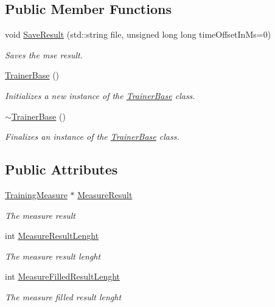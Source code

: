 \subsection*{Public Member Functions}
\begin{DoxyCompactItemize}
\item 
void \hyperlink{class_n_n_t_lib_1_1_trainer_base_ac048e1d40c13b919dc254559acf715e8}{Save\+Result} (std\+::string file, unsigned long long time\+Offset\+In\+Ms=0)
\begin{DoxyCompactList}\small\item\em Saves the mse result. \end{DoxyCompactList}\item 
\hyperlink{class_n_n_t_lib_1_1_trainer_base_a0b0d5fb69ec3526f9f1877d69a45f4f2}{Trainer\+Base} ()
\begin{DoxyCompactList}\small\item\em Initializes a new instance of the \hyperlink{class_n_n_t_lib_1_1_trainer_base}{Trainer\+Base} class. \end{DoxyCompactList}\item 
\hyperlink{class_n_n_t_lib_1_1_trainer_base_ac09e5c17c77cc5c76a896e1595a02f64}{$\sim$\+Trainer\+Base} ()
\begin{DoxyCompactList}\small\item\em Finalizes an instance of the \hyperlink{class_n_n_t_lib_1_1_trainer_base}{Trainer\+Base} class. \end{DoxyCompactList}\end{DoxyCompactItemize}
\subsection*{Public Attributes}
\begin{DoxyCompactItemize}
\item 
\hyperlink{struct_n_n_t_lib_1_1_training_measure}{Training\+Measure} $\ast$ \hyperlink{class_n_n_t_lib_1_1_trainer_base_a557584860d1e68175e6902b4095cefde}{Measure\+Result}
\begin{DoxyCompactList}\small\item\em The measure result \end{DoxyCompactList}\item 
int \hyperlink{class_n_n_t_lib_1_1_trainer_base_a7077caabdc27417bbb200537f6a8bcda}{Measure\+Result\+Lenght}
\begin{DoxyCompactList}\small\item\em The measure result lenght \end{DoxyCompactList}\item 
int \hyperlink{class_n_n_t_lib_1_1_trainer_base_a813093150b33e456c99428f2a4191c66}{Measure\+Filled\+Result\+Lenght}
\begin{DoxyCompactList}\small\item\em The measure filled result lenght \end{DoxyCompactList}\end{DoxyCompactItemize}
